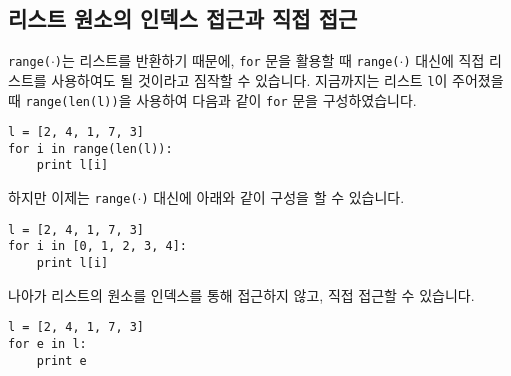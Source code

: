 \documentclass[../main.tex]{subfiles}
\begin{document}
\subsection{리스트 원소의 인덱스 접근과 직접 접근}
\texttt{range($\cdot$)}는 리스트를 반환하기 때문에, \texttt{for} 문을 활용할 때 \texttt{range($\cdot$)} 대신에 직접 리스트를 사용하여도 될 것이라고 짐작할 수 있습니다.
지금까지는 리스트 \texttt{l}이 주어졌을 때 \texttt{range(len(l))}을 사용하여 다음과 같이 \texttt{for} 문을 구성하였습니다.
\begin{verbatim}
l = [2, 4, 1, 7, 3]
for i in range(len(l)):
    print l[i]
\end{verbatim}
하지만 이제는 \texttt{range($\cdot$)} 대신에 아래와 같이 구성을 할 수 있습니다.
\begin{verbatim}
l = [2, 4, 1, 7, 3]
for i in [0, 1, 2, 3, 4]:
    print l[i]
\end{verbatim}
나아가 리스트의 원소를 인덱스를 통해 접근하지 않고, 직접 접근할 수 있습니다.
\begin{verbatim}
l = [2, 4, 1, 7, 3]
for e in l:
    print e
\end{verbatim}
\end{document}
